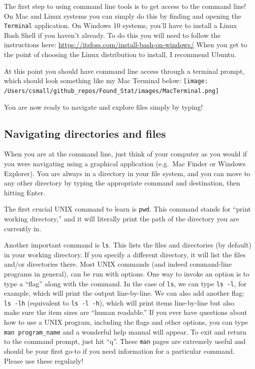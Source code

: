 \documentclass[]{book}
\begin{document}
The first step to using command line tools is to get access to the command line! On Mac and Linux systems you can simply do this by finding and opening the \texttt{Terminal} application. On Windows 10 systems, you'll have to install a Linux Bash Shell if you haven't already. To do this you will need to follow the instructions here: \url{https://itsfoss.com/install-bash-on-windows/}
When you get to the point of choosing the Linux distribution to install, I recommend Ubuntu.

At this point you should have command line access through a terminal prompt, which should look something like my Mac Terminal below:
\texttt{[image: /Users/csmall/github\_repos/Found\_Stat/images/MacTerminal.png]}

You are now ready to navigate and explore files simply by typing!

\hypertarget{navigating-directories-and-files}{%
\subsection{Navigating directories and files}\label{navigating-directories-and-files}}

When you are at the command line, just think of your computer as you would if you were navigating using a graphical application (e.g.~Mac Finder or Windows Explorer). You are always in a directory in your file system, and you can move to any other directory by typing the appropriate command and destination, then hitting Enter.

The first crucial UNIX command to learn is \texttt{pwd}. This command stands for ``print working directory,'' and it will literally print the path of the directory you are currently in.

Another important command is \texttt{ls}. This lists the files and directories (by default) in your working directory. If you specify a different directory, it will list the files and/or directories there. Most UNIX commands (and indeed command-line programs in general), can be run with options. One way to invoke an option is to type a ``flag'' along with the command. In the case of \texttt{ls}, we can type \texttt{ls\ -l}, for example, which will print the output line-by-line. We can also add another flag: \texttt{ls\ -lh} (equivalent to \texttt{ls\ -l\ -h}), which will print items line-by-line but also make sure the item sizes are ``human readable.'' If you ever have questions about how to use a UNIX program, including the flags and other options, you can type \texttt{man\ program\_name} and a wonderful help manual will appear. To exit and return to the command prompt, just hit ``q''. These \texttt{man} pages are extremely useful and should be your first go-to if you need information for a particular command. Please use these regularly!
\end{document}
